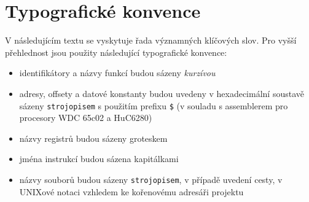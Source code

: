 
\cleardoublepage
\noindent
\chapter*{Typografické konvence}

V následujícím textu se vyskytuje řada významných klíčových slov. Pro vyšší
přehlednost jsou použity následující typografické konvence:

\begin{itemize}
\item identifikátory a názvy funkcí budou sázeny {\it kurzívou}

\item adresy, offsety a datové konstanty budou uvedeny v hexadecimální soustavě
	sázeny {\tt strojopisem} s použitím prefixu {\tt \$} (v souladu s
	assemblerem pro procesory WDC 65c02 a HuC6280)

\item názvy registrů budou sázeny {\sf groteskem}

\item jména instrukcí budou sázena {\sc kapitálkami}

\item názvy souborů budou sázeny {\tt strojopisem}, v případě uvedení cesty,
	v UNIXové notaci vzhledem ke kořenovému adresáři projektu
\end{itemize}
